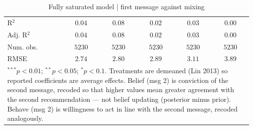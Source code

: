 \begin{table}
\begin{center}
\begin{tabular}{l c c c c c}
\hline
R$^2$                                             & $0.04$       & $0.08$       & $0.02$       & $0.03$       & $0.00$       \\
Adj. R$^2$                                        & $0.04$       & $0.08$       & $0.02$       & $0.03$       & $0.00$       \\
Num. obs.                                         & $5230$       & $5230$       & $5230$       & $5230$       & $5230$       \\
RMSE                                              & $2.74$       & $2.80$       & $2.89$       & $3.11$       & $3.89$       \\
\hline
\multicolumn{6}{l}{\scriptsize{\item $^{***}p<0.01$; $^{**}p<0.05$; $^{*}p<0.1$. Treatments are demeaned (Lin 2013) so reported coefficients are average effects. Belief (msg 2) is conviction of the second message, recoded so that higher values mean greater agreement with the second recommendation --- not belief updating (posterior minus prior). Behave (msg 2) is willingness to act in line with the second message, recoded analogously.}}
\end{tabular}
\caption{Fully saturated model | first message against mixing}
\label{table:saturated_0}
\end{center}
\end{table}

